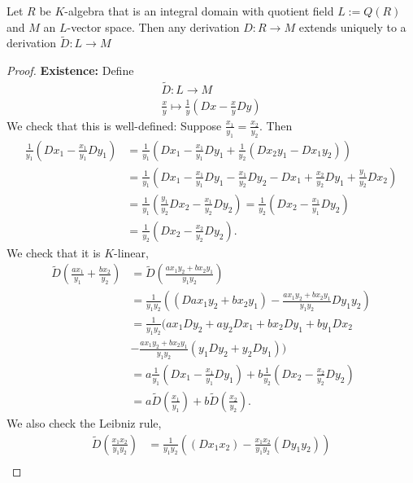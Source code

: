 \begin{lemma}\label{ExtensionToFieldOfFractions}
    Let $R$ be $K$-algebra that is an integral domain with quotient field $L := Q(R)$ and $M$ an $L$-vector space. Then any derivation $D:R\rightarrow M$ extends uniquely to a derivation $\widetilde{D} : L \rightarrow M$ 
\end{lemma}
\begin{proof}
    \textbf{Existence:} Define 
    \begin{gather*}
        \widetilde{D} : L \rightarrow M\\
        \frac{x}{y} \mapsto \frac{1}{y}\left(Dx-\frac{x}{y}Dy\right)
    \end{gather*}
    We check that this is well-defined: Suppose $\frac{x_1}{y_1}=\frac{x_2}{y_2}$. Then 
    \begin{align*}
        \frac{1}{y_1}\left(Dx_1-\frac{x_1}{y_1}Dy_1 \right) &=  \frac{1}{y_1}\left(Dx_1-\frac{x_1}{y_1}Dy_1 +\frac{1}{y_2}\left(Dx_2y_1-Dx_1y_2\right) \right)\\
        &= \frac{1}{y_1}\left(Dx_1-\frac{x_1}{y_1}Dy_1 -\frac{x_1}{y_2}Dy_2-Dx_1+\frac{x_2}{y_2}Dy_1+\frac{y_1}{y_2}Dx_2 \right)\\
        &= \frac{1}{y_1}\left(\frac{y_1}{y_2}Dx_2-\frac{x_1}{y_2}Dy_2 \right) = \frac{1}{y_2}\left(Dx_2-\frac{x_1}{y_1}Dy_2\right)\\
        &= \frac{1}{y_2}\left(Dx_2-\frac{x_2}{y_2}Dy_2\right).
    \end{align*}
    We check that it is $K$-linear,
    \begin{align*}
        \widetilde{D}\left(\frac{ax_1}{y_1}+\frac{bx_2}{y_2}\right) &= \widetilde{D}\left(\frac{ax_1y_2+bx_2y_1}{y_1y_2}\right)\\
        &= \frac{1}{y_1y_2}\left((Dax_1y_2+bx_2y_1)-\frac{ax_1y_2+bx_2y_1}{y_1y_2}Dy_1y_2\right)\\
        &= \frac{1}{y_1y_2}\bigg(ax_1Dy_2+ay_2Dx_1+bx_2Dy_1+by_1Dx_2\\ 
        &-\frac{ax_1y_2+bx_2y_1}{y_1y_2}(y_1Dy_2+y_2Dy_1)\bigg) \\
        &= a\frac{1}{y_1}\left(Dx_1-\frac{x_1}{y_1}Dy_1\right) + b\frac{1}{y_2}\left(Dx_2-\frac{x_2}{y_2}Dy_2\right)\\
        &= a\widetilde{D}\left(\frac{x_1}{y_1} \right)+b\widetilde{D}\left(\frac{x_2}{y_2}\right).
    \end{align*}
    We also check the Leibniz rule,
    \begin{align*}
        \widetilde{D}\left(\frac{x_1x_2}{y_1y_2}\right) &= \frac{1}{y_1y_2}\left((Dx_1x_2)-\frac{x_1x_2}{y_1y_2}(Dy_1y_2) \right)\\ 

\end{align*}
\end{proof}
